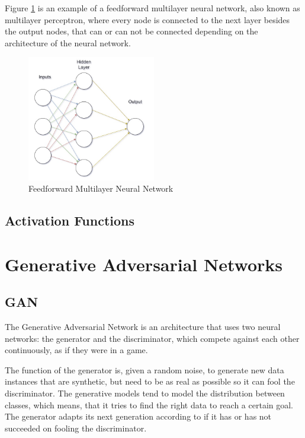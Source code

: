 \documentclass[12pt,a4paper,oneside]{memoir}
\begin{document}
Figure \ref{fig:nn} is an example of a feedforward multilayer neural network, also known as multilayer perceptron, where every node is connected to the next layer besides the output nodes, that can or can not be connected depending on the architecture of the neural network. 


\begin{figure}[H]
\centering
\includegraphics[width=0.5\textwidth]{images/nn.jpg}
\caption{Feedforward Multilayer Neural Network}
\centering
\label{fig:nn}
\end{figure}



\subsection{Activation Functions}




\clearpage{\thispagestyle{empty}\cleardoublepage}
\section{Generative Adversarial Networks}

\subsection{\acs{GAN}}
The Generative Adversarial Network is an architecture that uses two neural networks: the generator and the discriminator, which compete against each other continuously, as if they were in a game. 


\par The function of the generator is, given a random noise, to generate new data instances that are synthetic, but need to be as real as possible so it can fool the discriminator. The generative models tend to model the distribution between classes, which means, that it tries to find the right data to reach a certain goal. The generator adapts its next generation according to if it has or has not succeeded on fooling the discriminator.
\end{document}

